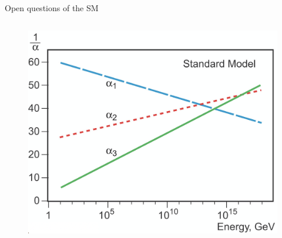 \documentclass[10pt]{beamer}
\begin{document}
\begin{frame}{Open questions of the SM}
\begin{columns}
\begin{column}{0.4\textwidth}
\begin{figure}
                \includegraphics[scale=0.2]{figures/coupling_constants_sm.png}
            \end{figure}
        \end{column}
    \end{columns}
\end{frame}
\end{document}
